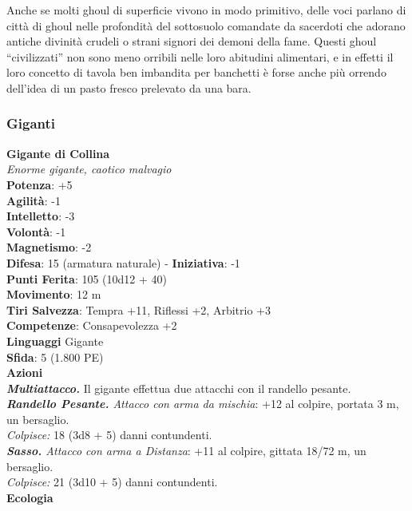 \begin{multicols}{2}
Anche se molti ghoul di superficie vivono in modo primitivo, delle voci parlano di città di ghoul nelle profondità del sottosuolo comandate da sacerdoti che adorano antiche divinità crudeli o strani signori dei demoni della fame. Questi ghoul “civilizzati” non sono meno orribili nelle loro abitudini alimentari, e in effetti il loro concetto di tavola ben imbandita per banchetti è forse anche più orrendo dell’idea di un pasto fresco prelevato da una bara.\\

\subsubsection{Giganti}

\medskip\textbf{Gigante di Collina}\\
\emph{Enorme gigante, caotico malvagio}\\
\textbf{Potenza}: +5\\
\textbf{Agilità}: -1\\
\textbf{Intelletto}: -3\\
\textbf{Volontà}: -1\\
\textbf{Magnetismo}: -2\\
\textbf{Difesa}: 15 (armatura naturale) - \textbf{Iniziativa}: -1\\
\textbf{Punti Ferita}: 105 (10d12 + 40)\\
\textbf{Movimento}: 12 m\\
\textbf{Tiri Salvezza}: Tempra +11, Riflessi +2, Arbitrio +3\\
\textbf{Competenze}: Consapevolezza +2\\
\textbf{Linguaggi} Gigante\\
\textbf{Sfida}: 5 (1.800 PE)\smallskip\\
\smallskip\textbf{Azioni}\\
\emph{\textbf{Multiattacco.}} Il gigante effettua due attacchi con il randello pesante.\\
\emph{\textbf{Randello Pesante.} Attacco con arma da mischia}: +12 al colpire, portata 3 m, un bersaglio.\\
\emph{Colpisce:} 18 (3d8 + 5) danni contundenti.\\
\emph{\textbf{Sasso.} Attacco con arma a Distanza}: +11 al colpire, gittata 18/72 m, un bersaglio.\\
\emph{Colpisce:} 21 (3d10 + 5) danni contundenti.\\
\textbf{Ecologia}\\

\end{multicols}
